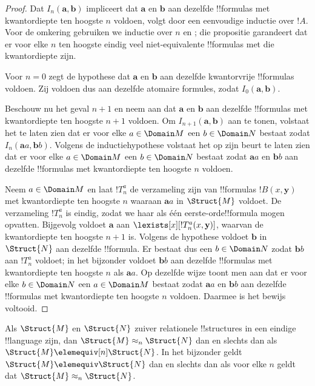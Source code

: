 \documentclass[../../../include/open-logic-section]{subfiles}
\begin{document}
\begin{proof}
  Dat $I_n(\mathbf{a},\mathbf{b})$ impliceert dat $\mathbf{a}$ en
  $\mathbf{b}$ aan dezelfde !!{formula}s met kwantordiepte ten hoogste
  $n$ voldoen, volgt door een eenvoudige inductie over $!A$. Voor de
  omkering gebruiken we inductie over $n$ en
  ; die propositie garandeert dat er voor elke
  $n$ ten hoogste eindig veel niet-equivalente !!{formula}s met die
  kwantordiepte zijn.

  Voor $n=0$ zegt de hypothese dat $\mathbf{a}$ en $\mathbf{b}$ aan
  dezelfde kwantorvrije !!{formula}s voldoen. Zij voldoen dus aan
  dezelfde atomaire formules, zodat $I_0(\mathbf{a},\mathbf{b})$.

  Beschouw nu het geval $n+1$ en neem aan dat $\mathbf{a}$ en
  $\mathbf{b}$ aan dezelfde !!{formula}s met kwantordiepte ten hoogste
  $n+1$ voldoen. Om $I_{n+1}(\mathbf{a},\mathbf{b})$ aan te tonen,
  volstaat het te laten zien dat er voor elke $a \in \Domain M$ een
  $b \in \Domain N$ bestaat zodat
  $I_n(\mathbf{a}a,\mathbf{b}b)$. Volgens de inductiehypothese volstaat
  het op zijn beurt te laten zien dat er voor elke $a \in \Domain M$
  een $b \in \Domain N$ bestaat zodat $\mathbf{a}a$ en
  $\mathbf{b}b$ aan dezelfde !!{formula}s met kwantordiepte ten
  hoogste $n$ voldoen.

  Neem $a \in \Domain M$ en laat $!T^a_n$ de verzameling zijn van
  !!{formula}s $!B(x,\mathbf{y})$ met kwantordiepte ten hoogste $n$
  waaraan $\mathbf{a}a$ in $\Struct{M}$ voldoet. De verzameling
  $!T^a_n$ is eindig, zodat we haar als één eerste-orde!!{formula}
  mogen opvatten. Bijgevolg voldoet $\mathbf{a}$ aan
  $\lexists[x][!T^a_n(x,\mathbf{y})]$, waarvan de kwantordiepte ten
  hoogste $n+1$ is. Volgens de hypothese voldoet $\mathbf{b}$ in
  $\Struct{N}$ aan dezelfde !!{formula}. Er bestaat dus een
  $b \in \Domain N$ zodat $\mathbf{b}b$ aan $!T^a_n$ voldoet; in het
  bijzonder voldoet $\mathbf{b}b$ aan dezelfde !!{formula}s met
  kwantordiepte ten hoogste $n$ als $\mathbf{a}a$. Op dezelfde wijze
  toont men aan dat er voor elke $b \in \Domain N$ een
  $a\in \Domain M$ bestaat zodat $\mathbf{a}a$ en $\mathbf{b}b$ aan
  dezelfde !!{formula}s met kwantordiepte ten hoogste $n$ voldoen.
  Daarmee is het bewijs voltooid.
\end{proof}

\begin{cor}
  Als $\Struct{M}$ en $\Struct{N}$ zuiver relationele !!{structure}s
  in een eindige !!{language} zijn, dan
  $\Struct{M} \approx_n\Struct{N}$ dan en slechts dan als
  $\Struct{M} \elemequiv[n] \Struct{N}$. In het bijzonder geldt
  $\Struct{M} \elemequiv \Struct{N}$ dan en slechts dan als voor elke
  $n$ geldt dat $\Struct{M} \approx_n \Struct{N}$.
\end{cor}
\end{document}
